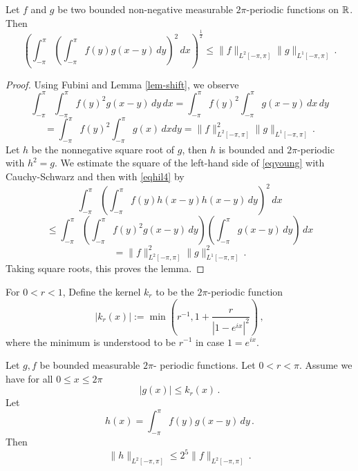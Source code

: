 {\begin{lemma}\label{young}
    Let $f$ and $g$ be two bounded non-negative measurable $2\pi$-periodic functions on ${\mathbb{R}}$. Then
    \begin{equation}\label{eqyoung}
        \left(\int_{-\pi}^{\pi} \left(\int_{-\pi}^{\pi}
        f(y)g(x-y)\, dy\right)^2\, dx\right)^{\frac 12}\le \|f\|_{L^2[-\pi, \pi]} \|g\|_{L^1[-\pi, \pi]}\, .
    \end{equation}
    \end{lemma}
\begin{proof}
Using Fubini and Lemma \ref{lem-shift}, we observe
\begin{equation*}
  \int_{-\pi}^{\pi}\int_{-\pi}^{\pi}f(y)^2g(x-y)\, dy
    \, dx=\int_{-\pi}^{\pi}f(y)^2\int_{-\pi}^{\pi}g(x-y)\, dx
    \, dy
\end{equation*}
\begin{equation}\label{eqhil4}
=\int_{-\pi}^{\pi}f(y)^2\int_{-\pi}^{\pi}g(x) \, dx
     dy
=\|f\|_{L^2[-\pi, \pi]}^2\|g\|_{L^1[-\pi, \pi]}\, .
\end{equation}
   Let $h$ be the  nonnegative square root of $g$, then
   $h$ is bounded and $2\pi$-periodic with $h^2=g$.
   We estimate the square of the left-hand side of
   \eqref{eqyoung} with Cauchy-Schwarz and then with
   \eqref{eqhil4} by
       \begin{equation*}
         \int_{-\pi}^{\pi} (\int_{-\pi}^{\pi}f(y)h(x-y)h(x-y)\, dy)^2\, dx
   \end{equation*}
\begin{equation*}
    \le \int_{-\pi}^{\pi}\left(\int_{-\pi}^{\pi}f(y)^2g(x-y)\, dy\right)
    \left(\int_{-\pi}^{\pi}g(x-y)\, dy\right)\, dx
\end{equation*}
\begin{equation*}
    = \|f\|_{L^2[-\pi, \pi]}^2\|g\|_{L^1[-\pi, \pi]}^2\, .
\end{equation*}
Taking square roots, this proves the lemma.
\end{proof}

For $0<r<1$, Define the kernel $k_r$ to be the $2\pi$-periodic function
\begin{equation}
    |k_r(x)|:=\min \left(r^{-1}, 1+\frac r{|1-e^{ix}|^2}\right)\, ,
\end{equation}
where the minimum is understood to be $r^{-1}$ in case $1=e^{ix}$.
\begin{lemma}\label{krbound}
Let $g,f$ be bounded measurable $2\pi$-
periodic functions. Let $0<r<\pi$.
Assume we have for all $0\le x\le 2\pi$
\begin{equation}
    |g(x)|\le k_r(x)\, .
\end{equation}
Let
\begin{equation}
   h(x)= \int_{-\pi}^{\pi} f(y)g(x-y)\, dy \, .
\end{equation}
Then
\begin{equation}
   \|h\|_{L^2[-\pi, \pi]}\le 2^{5}\|f\|_{L^2[-\pi, \pi]}  \, .
\end{equation}


\end{lemma}}
